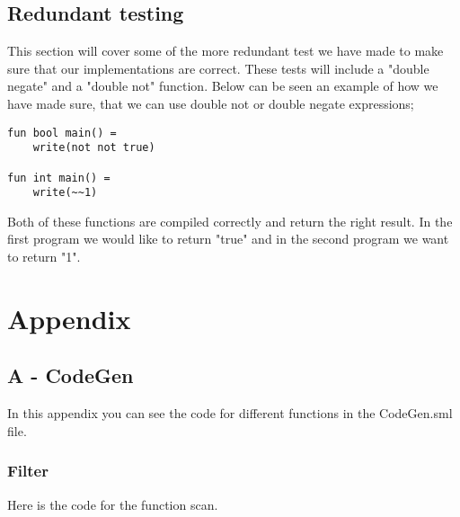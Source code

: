 \documentclass[12pt]{article}
\begin{document}
\subsection{Redundant testing}
This section will cover some of the more redundant test we have made to make sure that our implementations are correct. These tests will include a "double negate" and a "double not" function. Below can be seen an example of how we have made sure, that we can use double not or double negate expressions;
\begin{verbatim}
fun bool main() =
    write(not not true)
    
fun int main() =
    write(~~1)
\end{verbatim}
Both of these functions are compiled correctly and return the right result. In the first program we would like to return "true" and in the second program we want to return "1".

\pagebreak

\section{Appendix}
\subsection{A - CodeGen}
In this appendix you can see the code for different functions in the CodeGen.sml file.

\subsubsection{Filter}
Here is the code for the function scan. 
\end{document}
